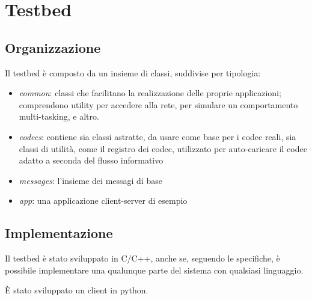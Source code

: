 \section{Testbed}



\subsection{Organizzazione}


Il testbed è composto da un insieme di classi, suddivise per tipologia:



\begin{itemize}
\item \emph{common}: classi che facilitano la realizzazione delle proprie
applicazioni; comprendono utility per accedere alla rete, per simulare un comportamento multi-tasking, e altro.

\item \emph{codecs}: contiene sia classi astratte, da usare come base per i
codec reali, sia classi di utilità, come il registro dei codec, utilizzato per auto-caricare il codec adatto a seconda del flusso informativo

\item \emph{messages}: l'insieme dei messagi di base
\item \emph{app}: una applicazione client-server di esempio
\end{itemize}




\subsection{Implementazione}


Il testbed è stato sviluppato in C/C++, anche se, seguendo le specifiche, è
possibile implementare una qualunque parte del sistema con qualsiasi linguaggio.

\`E stato sviluppato un client in python.








